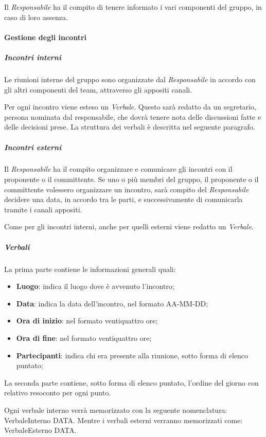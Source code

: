    					Il \textit{Responsabile} ha il compito di tenere informato i vari componenti del gruppo, in caso di loro assenza.
   			\paragraph{Gestione degli incontri}
   				\subparagraph{Incontri interni}
   					Le riunioni interne del gruppo sono organizzate dal \textit{Responsabile} in accordo con gli altri componenti del team, attraverso gli appositi canali.
   					
   					Per ogni incontro viene esteso un \textit{Verbale}. Questo sarà redatto da un segretario, persona nominata dal responsabile, che dovrà tenere nota delle discussioni fatte e delle decisioni prese. La struttura dei verbali è descritta nel seguente paragrafo. 
	   			\subparagraph{Incontri esterni}
   					Il \textit{Responsabile} ha il compito organizzare e comunicare gli incontri con il proponente o il committente. Se uno o più membri del gruppo, il proponente o il committente volessero organizzare un incontro, sarà compito del \textit{Responsabile} decidere una data, in accordo tra le parti, e successivamente di comunicarla tramite i canali appositi.
   					
   					Come per gli incontri interni, anche per quelli esterni viene redatto un \textit{Verbale}.
   				\subparagraph{Verbali}
   					La prima parte contiene le informazioni generali quali:
   					\begin{itemize}
   						\item \textbf{Luogo}: indica il luogo dove è avvenuto l'incontro;
   						\item \textbf{Data}: indica la data dell'incontro, nel formato AA-MM-DD;
   						\item \textbf{Ora di inizio}: nel formato ventiquattro ore;
   						\item \textbf{Ora di fine}: nel formato ventiquattro ore;
   						\item \textbf{Partecipanti}: indica chi era presente alla riunione, sotto forma di elenco puntato;
   					\end{itemize}
   					La seconda parte contiene, sotto forma di elenco puntato, l'ordine del giorno con relativo resoconto per ogni punto.
   					
   					Ogni verbale interno verrà memorizzato con la seguente nomenclatura: VerbaleInterno DATA.
   					Mentre i verbali esterni verranno memorizzati come: VerbaleEsterno DATA.
   					
